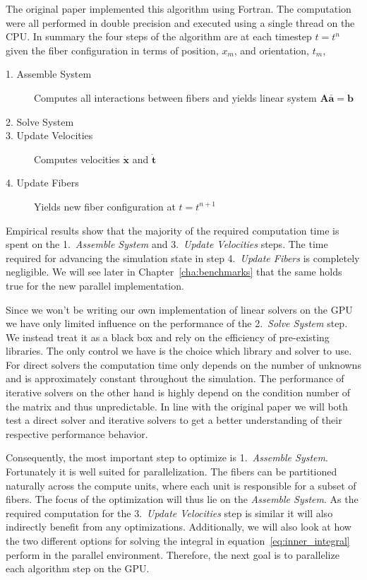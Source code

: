 The original paper implemented this algorithm using Fortran. The computation were all performed in double precision and executed using a single thread on the CPU. In summary the four steps of the algorithm are at each timestep $t=t^n$ given the fiber configuration in terms of position, $x_m$, and orientation, $t_m$, 
\begin{description}
  \item[1. Assemble System] Computes all interactions between fibers and yields linear system $\mathbf{A}\mathbf{\bar{a}}=\mathbf{b}$
  \item[2. Solve System] 
  \item[3. Update Velocities] Computes velocities $\mathbf{\dot{x}}$ and $\mathbf{\dot{t}}$
  \item[4. Update Fibers] Yields new fiber configuration at $t=t^{n+1}$
\end{description}

Empirical results show that the majority of the required computation time is spent on the 1.~\emph{Assemble System} and 3.~\emph{Update Velocities} steps. The time required for advancing the simulation state in step 4.~\emph{Update Fibers} is completely negligible. We will see later in Chapter~\ref{cha:benchmarks} that the same holds true for the new parallel implementation.

Since we won't be writing our own implementation of linear solvers on the GPU we have only limited influence on the performance of the 2.~\emph{Solve System} step. We instead treat it as a black box and rely on the efficiency of pre-existing libraries. The only control we have is the choice which library and solver to use. For direct solvers the computation time only depends on the number of unknowns and is approximately constant throughout the simulation. The performance of iterative solvers on the other hand is highly depend on the condition number of the matrix and thus unpredictable. In line with the original paper we will both test a direct solver and iterative solvers to get a better understanding of their respective performance behavior.

Consequently, the most important step to optimize is 1.~\emph{Assemble System}. Fortunately it is well suited for parallelization. The fibers can be partitioned naturally across the compute units, where each unit is responsible for a subset of fibers. The focus of the optimization will thus lie on the \emph{Assemble System}. As the required computation for the 3.~\emph{Update Velocities} step is similar it will also indirectly benefit from any optimizations. Additionally, we will also look at how the two different options for solving the integral in equation~\ref{eq:inner_integral} perform in the parallel environment. Therefore, the next goal is to parallelize each algorithm step on the GPU.
